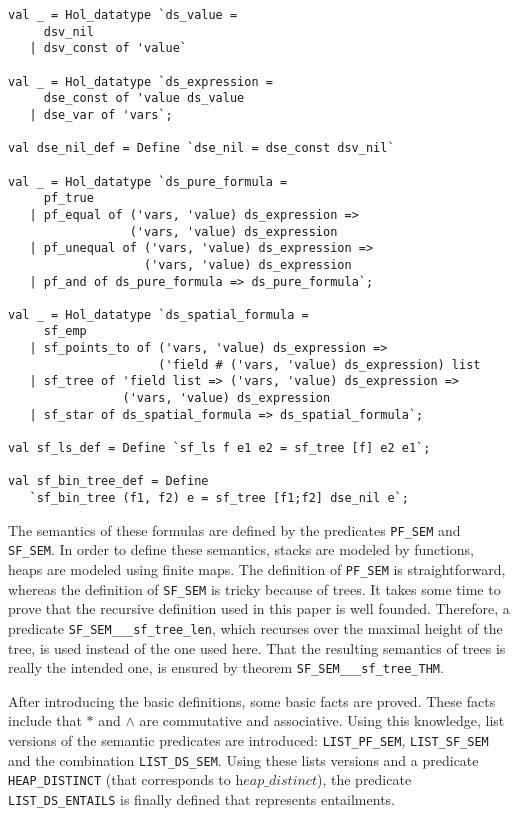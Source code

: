 \documentclass{scrartcl}
\theoremstyle{definition}
\newcommand{\heapdistinct}{\textit{heap\_distinct}}
\begin{document}
\begin{verbatim}
val _ = Hol_datatype `ds_value =
     dsv_nil 
   | dsv_const of 'value` 

val _ = Hol_datatype `ds_expression =
     dse_const of 'value ds_value
   | dse_var of 'vars`;

val dse_nil_def = Define `dse_nil = dse_const dsv_nil`

val _ = Hol_datatype `ds_pure_formula =
     pf_true
   | pf_equal of ('vars, 'value) ds_expression => 
                 ('vars, 'value) ds_expression
   | pf_unequal of ('vars, 'value) ds_expression => 
                   ('vars, 'value) ds_expression 
   | pf_and of ds_pure_formula => ds_pure_formula`;

val _ = Hol_datatype `ds_spatial_formula =
     sf_emp
   | sf_points_to of ('vars, 'value) ds_expression => 
                     ('field # ('vars, 'value) ds_expression) list
   | sf_tree of 'field list => ('vars, 'value) ds_expression => 
                ('vars, 'value) ds_expression 
   | sf_star of ds_spatial_formula => ds_spatial_formula`;

val sf_ls_def = Define `sf_ls f e1 e2 = sf_tree [f] e2 e1`;

val sf_bin_tree_def = Define 
   `sf_bin_tree (f1, f2) e = sf_tree [f1;f2] dse_nil e`;
\end{verbatim}

The semantics of these formulas are defined by the predicates \texttt{PF\_SEM}
and \texttt{SF\_SEM}. In order to define these semantics, stacks are modeled
by functions, heaps are modeled using finite maps. The definition of
\texttt{PF\_SEM} is straightforward, whereas the definition of
\texttt{SF\_SEM} is tricky because of trees. It takes some time to prove
that the recursive definition used in this paper is well founded.  Therefore,
a predicate \texttt{SF\_SEM\_\_\_sf\_tree\_len}, which recurses over the
maximal height of the tree, is used instead of the one used here. That
the resulting semantics of trees is really the intended one, is ensured by
theorem \texttt{SF\_SEM\_\_\_sf\_tree\_THM}.

After introducing the basic definitions, some basic facts are proved. These
facts include that $*$ and $\wedge$ are commutative and associative. Using
this knowledge, list versions of the semantic predicates are introduced:
\texttt{LIST\_PF\_SEM}, \texttt{LIST\_SF\_SEM} and the combination
\texttt{LIST\_DS\_SEM}. Using these lists versions and a predicate
\texttt{HEAP\_DISTINCT} (that corresponds to $\heapdistinct$), the predicate
\texttt{LIST\_DS\_ENTAILS} is finally defined that represents entailments.
\end{document}
